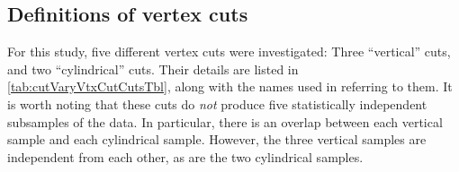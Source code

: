 \documentclass[../thesis.tex]{subfiles}
\begin{document}
\begin{comment}
Before going into the details of the efficiency calculation, it is worthwhile to demonstrate \emph{why} it is worthwhile to carry it out in the first place. First, we must define some vertex cuts to investigate. \autoref{tab:cutVaryVtxCutCutsTbl} lists five cuts along with the names we will use when referring to them in the remainder of this chapter. Using those definitions, Fig.~XXX shows the best-fit oscillation parameters obtained when applying these cuts without any efficiency correction. We expect some scatter, given that we are analyzing statistically independent subsamples.\footnote{More precisely, the three vertical cuts are statistically independent from each other, and likewise for the two radial cuts, but there \emph{is} a degree of overlap between each vertical and each radial cut. The overall point remains, however.}. Since we know that roughly half of the fit's uncertainty comes from statistics (as discussed in XXX fitting chapter), and since the vertical (radial) cuts approximately divide the sample into thirds (halves), we can estimate the statistical uncertainty on each subsample to be between $0.5\sqrt{2}$ and $0.5\sqrt{3}$ of the total (full sample statistical + systematic) uncertainty, i.e. 70--85\% of the total error bar. From Fig~XXX, it is apparent that the scale of the scatter is slightly larger than 1$\sigma$. While a mere statistical fluctuation cannot be ruled out, this result suggests that we should attempt to determine whether an AD-dependent efficiency variation may be playing a role (in which case a correction should be applied). As we will shortly show, when we measure the vertex efficiency, we do in fact find different values among the ADs, and applying a correction indeed reduces the scatter between the fit results.
\end{comment}

\begin{comment}
(XXX note we haven't actually plotted the results of applying no efficiency correction. The scatter might be well above 1sigma in which case we need to reword the above.)
\end{comment}

\subsection{Definitions of vertex cuts}
\label{sec:cutVaryVtxCutDescOfCuts}

For this study, five different vertex cuts were investigated: Three ``vertical'' cuts, and two ``cylindrical'' cuts. Their details are listed in \autoref{tab:cutVaryVtxCutCutsTbl}, along with the names used in referring to them. It is worth noting that these cuts do \emph{not} produce five statistically independent subsamples of the data. In particular, there is an overlap between each vertical sample and each cylindrical sample. However, the three vertical samples are independent from each other, as are the two cylindrical samples.
\end{document}
